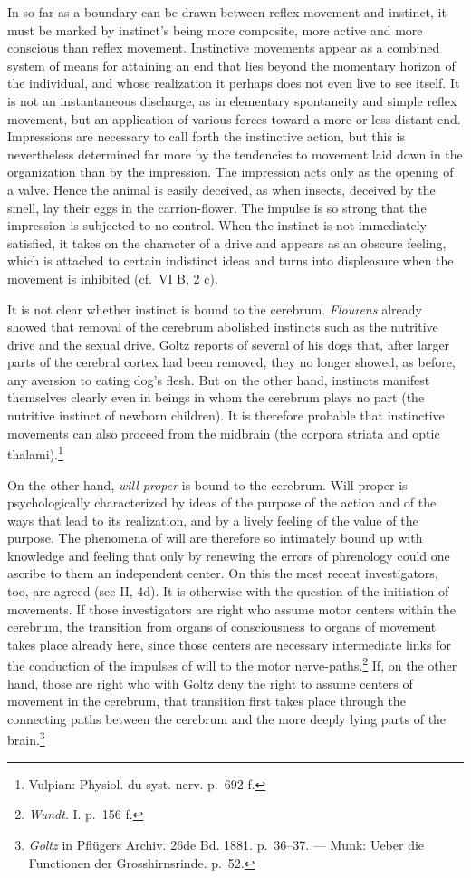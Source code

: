 \documentclass[12pt,a4paper]{book}
\newcommand{\opage}[1]{\marginnote{\footnotesize\textit{[#1]}}}
\begin{document}
In so far as a boundary can be drawn between reflex movement and
instinct, it must be marked by instinct's being more composite, more
active and more conscious than reflex
\opage{370}movement. Instinctive movements appear as a combined system of
means for attaining an end that lies beyond the momentary horizon of the
individual, and whose realization it perhaps does not even live to see
itself. It is not an instantaneous discharge, as in elementary
spontaneity and simple reflex movement, but an application of various
forces toward a more or less distant end. Impressions are necessary to
call forth the instinctive action, but this is nevertheless determined
far more by the tendencies to movement laid down in the organization
than by the impression. The impression acts only as the opening of a
valve. Hence the animal is easily deceived, as when insects, deceived by
the smell, lay their eggs in the carrion-flower. The impulse is so strong
that the impression is subjected to no control. When the instinct is not
immediately satisfied, it takes on the character of a drive and appears
as an obscure feeling, which is attached to certain indistinct ideas and
turns into displeasure when the movement is inhibited (cf.\ VI B, 2 c).

It is not clear whether instinct is bound to the cerebrum. \emph{Flourens}
already showed that removal of the cerebrum abolished instincts such as
the nutritive drive and the sexual drive. Goltz reports of several of his
dogs that, after larger parts of the cerebral cortex had been removed,
they no longer showed, as before, any aversion to eating dog's flesh. But
on the other hand, instincts manifest themselves clearly even in beings
in whom the cerebrum plays no part (the nutritive instinct of newborn
children). It is therefore probable that instinctive movements can also
proceed from the midbrain (the corpora striata and optic
thalami).\footnote{Vulpian: Physiol. du syst. nerv. p.~692 f.}

On the other hand, \emph{will proper} is bound to the cerebrum. Will
proper is psychologically characterized by ideas of the purpose of the
action and of the ways that lead to its realization, and by a lively
feeling of the value of the purpose. The phenomena of will are therefore
so intimately bound up with knowledge and feeling that only by renewing
the errors of phrenology could one ascribe to them an independent center.
On this the most recent investigators, too, are agreed (see II, 4d). It is
otherwise with the
\opage{371}question of the initiation of movements. If those investigators
are right who assume motor centers within the cerebrum, the transition
from organs of consciousness to organs of movement takes place already
here, since those centers are necessary intermediate links for the
conduction of the impulses of will to the motor
nerve-paths.\footnote{\emph{Wundt}. I. p.~156 f.} If, on the other hand,
those are right who with Goltz deny the right to assume centers of
movement in the cerebrum, that transition first takes place through the
connecting paths between the cerebrum and the more deeply lying
parts of the brain.\footnote{\emph{Goltz} in Pflügers Archiv. 26de Bd.
1881. p.~36--37. --- Munk: Ueber die Functionen der Grosshirnsrinde.
p.~52.}
\end{document}

